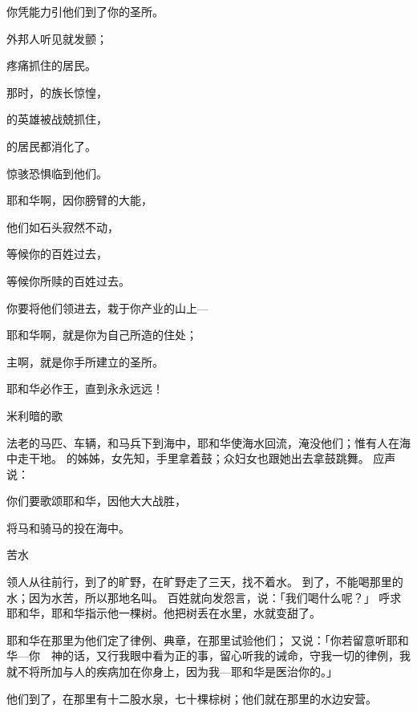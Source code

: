 {\par }{\Q 你凭能力引他们到了你的圣所。
\par }{\Q {}外邦人听见就发颤；
\par }{\Q 疼痛抓住{}的居民。
\par }{\Q {}那时，{}的族长惊惶，
\par }{的英雄被战兢抓住，
\par }{的居民{}都消化了。
\par }{\Q {}惊骇恐惧临到他们。
\par }{\Q 耶和华啊，因你膀臂的大能，
\par }{\Q 他们如石头寂然不动，
\par }{\Q 等候你的百姓过去，
\par }{\Q 等候你所赎的百姓过去。
\par }{\Q {}你要将他们领进去，栽于你产业的山上—
\par }{\Q 耶和华啊，就是你为自己所造的住处；
\par }{\Q 主啊，就是你手所建立的圣所。
\par }{\Q {}耶和华必作王，直到永永远远！
\par }{\BB \par }{\SH 米利暗的歌
\par }{\PP {}法老的马匹、车辆，和马兵下到海中，耶和华使海水回流，淹没他们；惟有{}人在海中走干地。
的姊姊，女先知{}，手里拿着鼓；众妇女也跟她出去拿鼓跳舞。
应声说：
\par }{\Q 你们要歌颂耶和华，因他大大战胜，
\par }{\Q 将马和骑马的投在海中。
\par }{\SH 苦水
\par }{\PP {}领{}人从{}往前行，到了{}的旷野，在旷野走了三天，找不着水。
到了{}，不能喝那里的水；因为水苦，所以那地名叫{}。
百姓就向{}发怨言，说：「我们喝什么呢？」
呼求耶和华，耶和华指示他一棵树。他把树丢在水里，水就变甜了。
\par }{\PP 耶和华在那里为他们定了律例、典章，在那里试验他们；
又说：「你若留意听耶和华—你　神的话，又行我眼中看为正的事，留心听我的诫命，守我一切的律例，我就不将所加与{}人的疾病加在你身上，因为我—耶和华是医治你的。」
\par }{\PP {}他们到了{}，在那里有十二股水泉，七十棵棕树；他们就在那里的水边安营。

}
